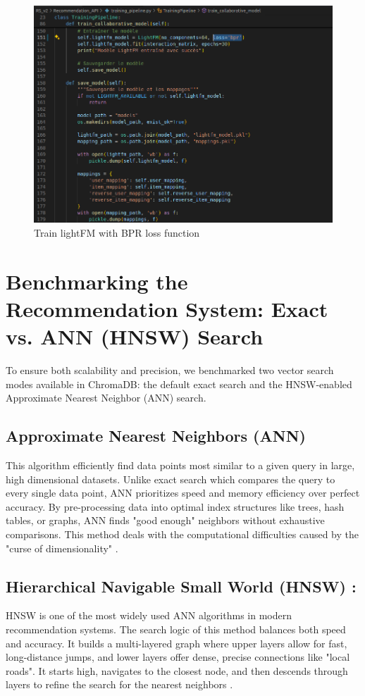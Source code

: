 \begin{center}
    \begin{figure}[H]
        \includegraphics[scale=0.39]{images/loss_function_lightFM.png}
        \caption{Train lightFM with BPR loss function}
        \label{fig:BPR_loss_function}
    \end{figure}
\end{center}


\newpage
\section{Benchmarking the Recommendation System: Exact vs. ANN (HNSW) Search}

To ensure both scalability and precision, we benchmarked two vector search modes available in ChromaDB: the default exact search and the HNSW-enabled Approximate Nearest Neighbor (ANN) search.
\subsection{Approximate Nearest Neighbors (ANN)}
This algorithm efficiently find data points most similar to a given query in large, high dimensional datasets. Unlike exact search which compares the query to every single data point, ANN prioritizes speed and memory efficiency over perfect accuracy. By pre-processing data into optimal index structures like trees, hash tables, or graphs, ANN finds "good enough" neighbors  without exhaustive comparisons. This method deals with the computational difficulties caused by the "curse of dimensionality"\cite{ANN} .

\subsection{Hierarchical Navigable Small World (HNSW) :}
HNSW is one of the most widely used ANN algorithms in modern recommendation systems. The search logic of this method balances both speed and accuracy. It builds a multi-layered graph where upper layers allow for fast, long-distance jumps, and lower layers offer dense, precise connections like "local roads". It starts high, navigates to the closest node, and then descends through layers to refine the search for the nearest neighbors\cite{HNSW} .


